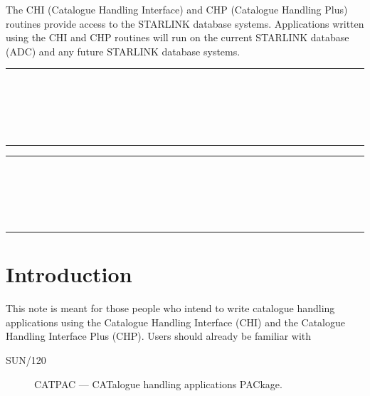 The CHI (Catalogue Handling Interface) and CHP (Catalogue Handling Plus)
routines provide access to the STARLINK database systems.
Applications written using the CHI and CHP routines will
run on the current STARLINK database (ADC) and any future STARLINK database
systems.

\newpage
\markright{\stardocname}
\null\vspace {5mm}
\begin {center}
\rule{80mm}{0.5mm} \\ [1ex]
{\Large\bf \stardoctita \\ [2.5ex]
           \stardoctitb \\ [2.5ex]
           \stardocversion} \\ [2ex]
\rule{80mm}{0.5mm}
\end{center}
\vspace{10mm}

\setlength{\parskip}{0mm}
\tableofcontents
\setlength{\parskip}{\medskipamount}

\newpage
\markright{\stardocname}
\renewcommand{\thepage}{\arabic{page}}
\setcounter{page}{1}

\null\vspace {5mm}
\begin {center}
\rule{80mm}{0.5mm} \\ [1ex]
{\Large\bf \stardoctita \\ [2.5ex]
           \stardoctitb \\ [2.5ex]
           \stardocversion} \\ [2ex]
\rule{80mm}{0.5mm}
\end{center}
\vspace{30mm}

\section {Introduction}

This note is meant for those people who intend to write catalogue handling
applications using the
Catalogue Handling Interface (CHI) and the Catalogue Handling Interface Plus
(CHP). Users should already be familiar with

\begin {description}

\item [SUN/120]  CATPAC --- CATalogue handling applications PACkage.

\end {description}


